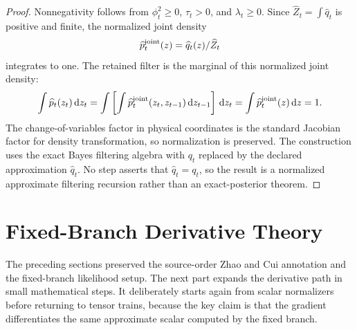 \documentclass[11pt]{article}
\numberwithin{equation}{section}
\newcommand{\dd}{\,\mathrm d}
\begin{document}
\begin{proof}
Nonnegativity follows from
\(\phi_t^2\ge0\), \(\tau_t>0\), and \(\lambda_t\ge0\).  Since
\(\widehat Z_t=\int\widehat q_t\) is positive and finite, the normalized joint
density
\[
    \widehat p_t^{\rm joint}(z)
    =
    \widehat q_t(z)/\widehat Z_t
\]
integrates to one.  The retained filter is the marginal of this normalized
joint density:
\[
    \int \widehat p_t(z_t)\dd z_t
    =
    \int
    \left[
    \int \widehat p_t^{\rm joint}(z_t,z_{t-1})\dd z_{t-1}
    \right]\dd z_t
    =
    \int \widehat p_t^{\rm joint}(z)\dd z
    =
    1.
\]
The change-of-variables factor in physical coordinates is the standard
Jacobian factor for density transformation, so normalization is preserved.  The
construction uses the exact Bayes filtering algebra with \(q_t\) replaced by
the declared approximation \(\widehat q_t\).  No step asserts that
\(\widehat q_t=q_t\), so the result is a normalized approximate filtering
recursion rather than an exact-posterior theorem.
\end{proof}


\section{Fixed-Branch Derivative Theory}

The preceding sections preserved the source-order Zhao and Cui \cite{zhao2024ttsequential} annotation and the
fixed-branch likelihood setup.  The next part expands the derivative path in
small mathematical steps.  It deliberately starts again from scalar
normalizers before returning to tensor trains, because the key claim is that
the gradient differentiates the same approximate scalar computed by the fixed
branch.
\end{document}
